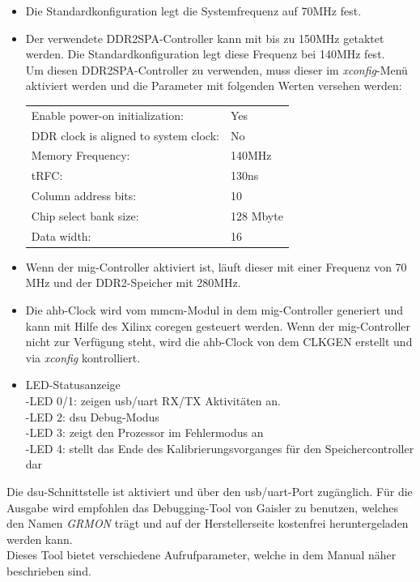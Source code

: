 \begin{itemize}
  \item Die Standardkonfiguration legt die Systemfrequenz auf 70MHz fest.
  \item Der verwendete DDR2SPA-Controller kann mit bis zu 150MHz getaktet werden. Die Standardkonfiguration legt diese Frequenz bei 140MHz fest.\\
   Um diesen DDR2SPA-Controller zu verwenden, muss dieser im \emph{xconfig}-Menü aktiviert werden und die Parameter mit folgenden Werten versehen werden:\\
  \begin{tabular}[t]{ll}
  Enable power-on initialization: & Yes\\
  DDR clock is aligned to system clock: & No\\
  Memory Frequency: & 140MHz\\
  tRFC: & 130ns\\
  Column address bits:  & 10 \\
  Chip select bank size: & 128 Mbyte\\
  Data width: & 16 \\
  \end{tabular}
  \item Wenn der \ac{mig}-Controller aktiviert ist, läuft dieser mit einer Frequenz von 70 MHz und der DDR2-Speicher mit 280MHz.\\
  \item Die \ac{ahb}-Clock wird vom \ac{mmcm}-Modul in dem \ac{mig}-Controller generiert und kann mit Hilfe des Xilinx \ac{coregen} gesteuert werden.
   Wenn der \ac{mig}-Controller nicht zur Verfügung steht, wird die \ac{ahb}-Clock von dem CLKGEN erstellt und via \emph{xconfig} kontrolliert.\\
  \item LED-Statusanzeige\\
  	-LED 0/1: zeigen \ac{usb}/\ac{uart} RX/TX Aktivitäten an.\\
  	-LED 2: \ac{dsu} Debug-Modus\\
  	-LED 3: zeigt den Prozessor im Fehlermodus an\\
  	-LED 4: stellt das Ende des Kalibrierungsvorganges für den Speichercontroller dar\\
  \end{itemize}
Die \ac{dsu}-Schnittstelle ist aktiviert und über den \ac{usb}/\ac{uart}-Port zugänglich.
  Für die Ausgabe wird empfohlen das Debugging-Tool von Gaisler zu benutzen, welches den Namen \emph{GRMON} trägt und auf der Herstellerseite kostenfrei heruntergeladen werden kann.\\
  Dieses Tool bietet verschiedene Aufrufparameter, welche in dem Manual näher beschrieben sind.\\


